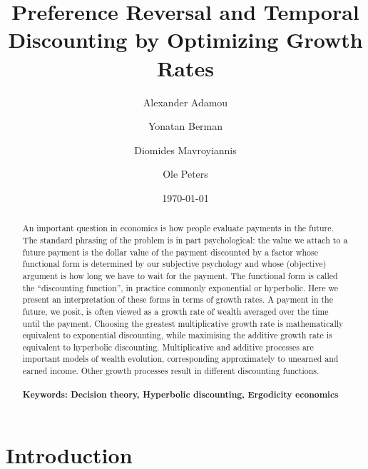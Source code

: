 \documentclass[11pt]{article}
\numberwithin{equation}{section}
\begin{document}
\begin{titlepage}
\title{Preference Reversal and Temporal Discounting by Optimizing Growth Rates}
\author{Alexander Adamou \and Yonatan Berman \and Diomides Mavroyiannis \and Ole Peters}
\date{\today}
\maketitle
\begin{abstract}
\noindent An important question in economics is how people evaluate payments in the future. The standard phrasing of the problem is in part psychological: the value we attach to a future payment is the dollar value of the payment discounted by a factor whose functional form is determined by our subjective psychology and whose (objective) argument is how long we have to wait for the payment. The functional form is called the ``discounting function'', in practice commonly exponential or hyperbolic. Here we present an interpretation of these forms in terms of growth rates. A payment in the future, we posit, is often viewed as a growth rate of wealth averaged over the time until the payment. Choosing the greatest multiplicative growth rate is mathematically equivalent to exponential discounting, while maximising the additive growth rate is equivalent to hyperbolic discounting. Multiplicative and additive processes are important models of wealth evolution, corresponding approximately to unearned and earned income. Other growth processes result in different discounting functions.
\\
\\
\noindent\textbf{Keywords: Decision theory, Hyperbolic discounting, Ergodicity economics}
\\

\bigskip
\end{abstract}
\setcounter{page}{0}
\thispagestyle{empty}
\end{titlepage}
\pagebreak \newpage

\section{Introduction}\label{sec:introduction}
\end{document}
